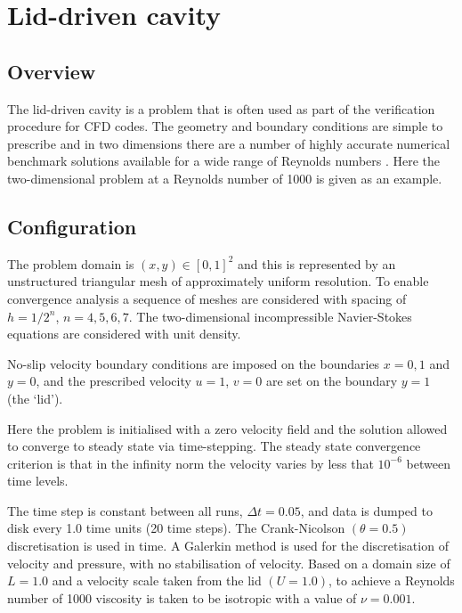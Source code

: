 
\section{Lid-driven cavity}
\label{sec:lid_driven_cavity}

\subsection{Overview}
The lid-driven cavity is a problem that is often used as part of the verification procedure for
CFD codes. The geometry and boundary conditions are simple to prescribe and in
two dimensions there are a number of highly accurate numerical benchmark solutions
available for a wide range of Reynolds numbers \citep{botella1998,erturk2005,bruneau2006}. 
Here the two-dimensional problem at a Reynolds number of 1000 is given as an example.

\subsection{Configuration}
The problem domain is $(x,y) \in [0,1]^2$ and this is represented by an unstructured triangular mesh
of approximately uniform resolution. To enable convergence analysis a sequence of meshes are considered
with spacing of $h=1/2^n$, $n=4,5,6,7$. The two-dimensional incompressible Navier-Stokes equations are
considered with unit density.

No-slip velocity boundary conditions are imposed on the boundaries $x=0,1$ and $y=0$, 
and the prescribed velocity $u=1$, $v=0$ are set on the boundary $y=1$ (the `lid'). 

Here the problem is initialised with a zero velocity field and the solution
allowed to converge to steady state via time-stepping. The steady state convergence criterion is
that in the infinity norm the velocity varies by less that $10^{-6}$ between time levels.

The time step is constant between all runs, $\Delta t = 0.05$, and data is dumped to disk every
1.0 time units (20 time steps). The Crank-Nicolson $(\theta=0.5)$ discretisation is used in time. 
A \Poo Galerkin method is used for the discretisation of velocity and pressure, with no stabilisation
of velocity. Based on a domain size of $L=1.0$ and a velocity scale taken from the lid $(U=1.0)$, to achieve
a Reynolds number of 1000 viscosity is taken to be isotropic with a value of $\nu=0.001$.

